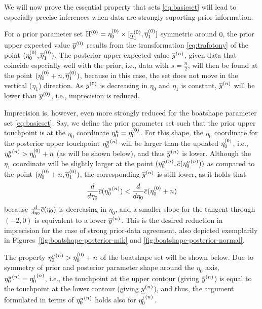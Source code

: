 We will now prove the essential property that sets \eqref{eq:basicset}
will lead to especially precise inferences when data are strongly suporting prior information.

For a prior parameter set $\mathrm{H}^{(0)} = \eta_0^{(0)} \times [\underline{\eta}_1^{(0)},\overline{\eta}_1^{(0)}]$
symmetric around $0$,
the prior upper expected value $\overline{y}^{(0)}$
results from the transformation \eqref{eq:trafotony} of the point $(\eta_0^{(0)},\overline{\eta}_1^{(0)})$.
The posterior upper expected value $\overline{y}^{(n)}$,
given data that coincide especially well with the prior,
i.e., data with $s = \frac{n}{2}$, will then be found at the point $(\eta_0^{(0)}+n,\overline{\eta}_1^{(0)})$,
because in this case, the set does not move in the vertical ($\eta_1$) direction.
As $y^{(0)}$ is decreasing in $\eta_0$ and $\eta_1$ is constant, $\overline{y}^{(n)}$ %
will be lower than $\overline{y}^{(0)}$, i.e., imprecision is reduced.

Imprecision is, however, even more strongly reduced for the boatshape parameter set \eqref{eq:basicset}.
Say, we define the prior parameter set such that the prior upper touchpoint
is at the $\eta_0$ coordinate $\eta_0^u = \eta_0^{(0)}$.
For this shape, the $\eta_0$ coordinate for the posterior upper touchpoint ${\eta_0^u}^{(n)}$
will be  larger than the updated $\eta_0^{(0)}$, i.e., ${\eta_0^u}^{(n)} > \eta_0^{(0)} + n$ (as will be shown below), and thus $\overline{y}^{(n)}$ is lower.
Although the $\eta_1$ coordinate will be slightly larger at the point $({\eta_0^u}^{(n)}, \overline{c}({\eta_0^u}^{(n)}))$
as compared to the point $(\eta_0^{(0)}+n,\overline{\eta}_1^{(0)})$, the corresponding $\overline{y}^{(n)}$ is still lower,
as it holds that
\begin{align*}
\frac{d}{d\eta_0} \overline{c}({\eta_0^u}^{(n)}) < \frac{d}{d\eta_0} \overline{c}(\eta_0^{(0)} + n)
\end{align*}
because $\frac{d}{d\eta_0} \overline{c}(\eta_0)$ is decreasing in $\eta_0$,
and a smaller slope for the tangent through $(-2,0)$ is equivalent to a lower $\overline{y}^{(n)}$.
This is the desired reduction in imprecision for the case of strong prior-data agreement,
also depicted exemplarily in Figures~\ref{fig:boatshape-posterior-mik} and \ref{fig:boatshape-posterior-normal}.

The property ${\eta_0^u}^{(n)} > \eta_0^{(0)} + n$ of the boatshape set will be shown below.
Due to symmetry of prior and posterior parameter shape around the $\eta_0$ axis,
${\eta_0^u}^{(n)} = {\eta_0^l}^{(n)}$, i.e.,
the touchpoint at the upper contour (giving $\overline{y}^{(n)}$) is equal to
the touchpoint at the lower contour (giving $\underline{y}^{(n)}$),
and thus, the argument formulated in terms of ${\eta_0^u}^{(n)}$ holds also for ${\eta_0^l}^{(n)}$.

